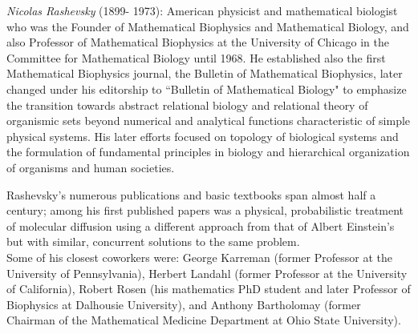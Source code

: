 \documentclass[12pt]{article}
\theoremstyle{plain}
\theoremstyle{definition}
\numberwithin{equation}{section}
\begin{document}
\emph{Nicolas Rashevsky} (1899- 1973): American physicist and mathematical biologist who was the Founder of Mathematical Biophysics and Mathematical Biology, and also Professor of Mathematical Biophysics at the University of Chicago in the Committee for Mathematical Biology until 1968. He established also the first Mathematical Biophysics journal, the Bulletin of Mathematical Biophysics, later changed under his editorship to ``Bulletin of Mathematical Biology" to emphasize the transition towards abstract relational biology and relational theory of organismic sets beyond numerical and analytical functions characteristic of simple physical systems. His later efforts focused on topology of biological systems and the formulation of fundamental principles in biology and hierarchical organization of organisms and human societies. 

Rashevsky's numerous publications and basic textbooks span almost half a century; among his first published papers was a physical, probabilistic treatment of molecular diffusion using a different approach from that of Albert Einstein's but with similar, concurrent solutions to the same problem. \\

Some of his closest coworkers were: George Karreman (former Professor at the University of Pennsylvania), Herbert Landahl (former Professor at the University of California), Robert Rosen (his mathematics PhD student and later Professor of Biophysics at Dalhousie University), and Anthony Bartholomay (former Chairman of the Mathematical Medicine Department at Ohio State University).
\end{document}
